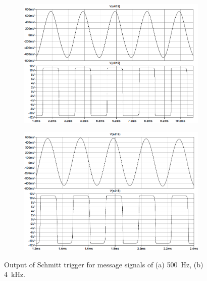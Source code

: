 \documentclass[11pt,letter,notitlepage]{article}
\begin{document}
	\begin{figure}[h]
		\centering
		\begin{subfigure}{0.9\linewidth}
			\centering
			\includegraphics[width=\linewidth]{schmitt/schmitt500img}
			\caption{}
			\label{fig:schmitt500img}
		\end{subfigure}
		
		\begin{subfigure}{0.9\linewidth}
			\centering
			\includegraphics[width=\linewidth]{schmitt/schmitt4000img}
			\caption{}
			\label{fig:schmitt4000img}
		\end{subfigure}
		
		\caption{Output of Schmitt trigger for message signals of (a) \SI{500}{\Hz}, (b) \SI{4}{\kHz}.}
		\label{fig:schmittimg}
	\end{figure}

	\clearpage %
\end{document}
